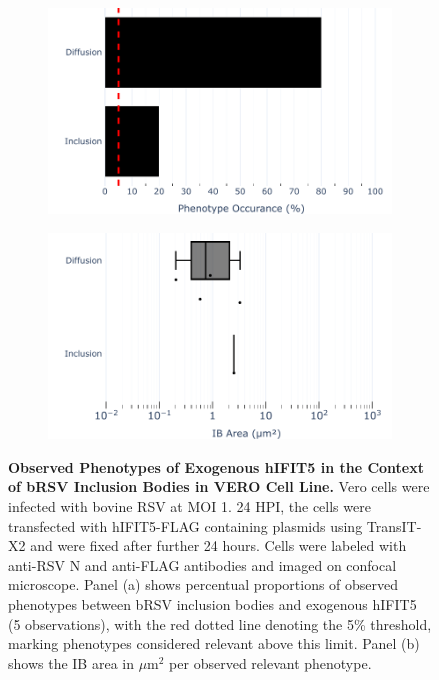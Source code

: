 \begin{figure}
    \begin{subfigure}{0.495\textwidth}
        \caption{}
        \includegraphics[width=1\linewidth]{09. Chapter 4/Figs/02. Overexpression/04. IFIT5/04. bar_i5_brsv.pdf} 
    \end{subfigure}
    \begin{subfigure}{0.495\textwidth}
        \caption{}
        \includegraphics[width=1\linewidth]{09. Chapter 4/Figs/02. Overexpression/04. IFIT5/05. box_i5_brsv.pdf}
    \end{subfigure}
    \caption[Observed Phenotypes of Exogenous hIFIT5 in the Context of bRSV Inclusion Bodies in VERO Cell Line.]{\textbf{Observed Phenotypes of Exogenous hIFIT5 in the Context of bRSV Inclusion Bodies in VERO Cell Line.} Vero cells were infected with bovine RSV at MOI 1. 24 HPI, the cells were transfected with hIFIT5-FLAG containing plasmids using TransIT-X2 and were fixed after further 24 hours. Cells were labeled with anti-RSV N and anti-FLAG antibodies and imaged on confocal microscope. Panel (a) shows percentual proportions of observed phenotypes between bRSV inclusion bodies and exogenous hIFIT5 (5 observations), with the red dotted line denoting the 5\% threshold, marking phenotypes considered relevant above this limit. Panel (b) shows the IB area in \(\mu \mbox{m}^2\) per observed relevant phenotype.}
    \label{fig:Observed Phenotypes of Exogenous hIFIT5 in the Context of bRSV Inclusion Bodies in VERO Cell Line}
\end{figure}

